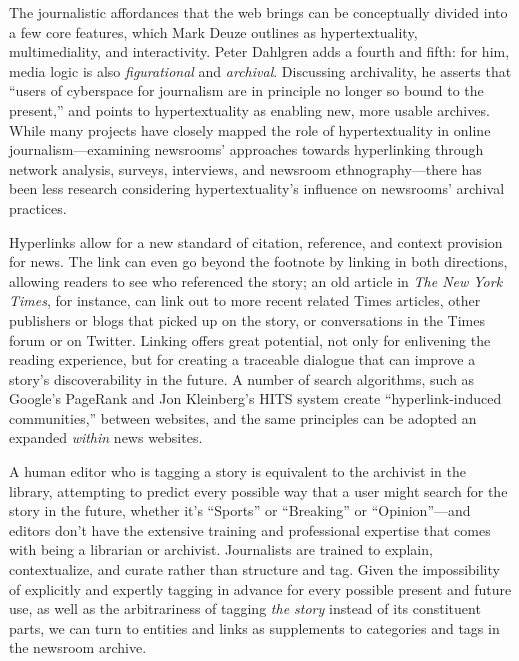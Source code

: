 The journalistic affordances that the web brings can be conceptually divided into a few core features, which Mark Deuze outlines as hypertextuality, multimediality, and interactivity.\autocite{deuze_web_2003} Peter Dahlgren adds a fourth and fifth: for him, media logic is also \emph{figurational} and \emph{archival}. Discussing archivality, he asserts that ``users of cyberspace for journalism are in principle no longer so bound to the present,'' and points to hypertextuality as enabling new, more usable archives.\autocite[66]{dahlgren_media_1996} While many projects have closely mapped the role of hypertextuality in online journalism---examining newsrooms' approaches towards hyperlinking through network analysis, surveys, interviews, and newsroom ethnography---there has been less research considering hypertextuality's influence on newsrooms' archival practices.

Hyperlinks allow for a new standard of citation, reference, and context provision for news. The link can even go beyond the footnote by linking in both directions, allowing readers to see who referenced the story; an old article in \emph{The New York Times}, for instance, can link out to more recent related Times articles, other publishers or blogs that picked up on the story, or conversations in the Times forum or on Twitter. Linking offers great potential, not only for enlivening the reading experience, but for creating a traceable dialogue that can improve a story's discoverability in the future. A number of search algorithms, such as Google's PageRank and Jon Kleinberg's HITS system create ``hyperlink-induced communities,''\autocite[12]{chakrabarti_mining_2003} between websites, and the same principles can be adopted an expanded \emph{within} news websites.  


A human editor who is tagging a story is equivalent to the archivist in the library, attempting to predict every possible way that a user might search for the story in the future, whether it's ``Sports'' or ``Breaking'' or ``Opinion''---and editors don't have the extensive training and professional expertise that comes with being a librarian or archivist. Journalists are trained to explain, contextualize, and curate rather than structure and tag. Given the impossibility of explicitly and expertly tagging in advance for every possible present and future use, as well as the arbitrariness of tagging \emph{the story} instead of its constituent parts, we can turn to entities and links as supplements to categories and tags in the newsroom archive.

